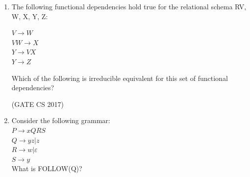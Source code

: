 \documentclass[a4paper, 11pt]{article}
\begin{document}
\begin{enumerate}
    \item The following functional dependencies hold true for the relational schema R{V, W, X, Y, Z}:
    \begin{center}
        $V\rightarrow W$\\
        $VW\rightarrow X$\\
        $Y\rightarrow VX$\\
        $Y\rightarrow Z$
    \end{center}
    Which of the following is irreducible equivalent for this set of functional dependencies?
    
    \begin{enumerate}
    \end{enumerate}
    
    \hfill (GATE CS 2017)
    
    \item Consider the following grammar:\\
    $P \rightarrow x QRS$\\
    $Q\rightarrow yz | z$\\
    $R\rightarrow w | \varepsilon$\\
    $S\rightarrow y$\\
    What is FOLLOW(Q)?
    
    \begin{enumerate}
    \end{enumerate}
    

\end{enumerate}
\end{document}

